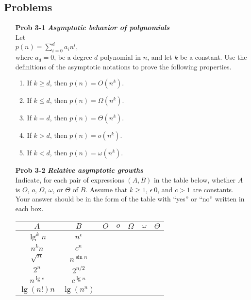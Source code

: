 \documentclass[fontsize=12pt,paper=a4]{book}
\begin{document}
\subsection*{Problems}
\begin{enumerate}
 \item[\textbf{Prob 3-1}]
       \textbf{\textit{Asymptotic behavior of polynomials}}\\
       Let \\
       $p(n) = \sum_{i=0}^{d} a_in^i$,\\
       where $a_d=0$, be a degree-$d$ polynomial in $n$, and let $k$ be a constant. Use the definitions of the asymptotic notations to prove the following properties.
       \begin{enumerate}
        \item If $k \geq d$, then $p(n) = O(n^k)$.
        \item If $k \leq d$, then $p(n) = \Omega(n^k)$.
        \item If $k = d$, then $p(n) = \Theta(n^k)$.
        \item If $k > d$, then $p(n) = o(n^k)$.
        \item If $k < d$, then $p(n) = \omega(n^k)$.
       \end{enumerate}
       
       
 \item[\textbf{Prob 3-2}]
       \textbf{\textit{Relative asymptotic growths}}\\
       Indicate, for each pair of expressions $(A, B)$ in the table below, whether $A$ is $O$, $o$, $\Omega$, $\omega$, or $\Theta$ of $B$. Assume that $k \geq 1$, $\epsilon \> 0$, and $c>1$ are constants. Your answer should be in the form of the table with “yes” or “no” written in each box.
       \begin{tabular}{c c | p{2em} | p{2em} | p{2em} | p{2em} | p{2em} |}
        $A$         & $B$          & $O$ & $o$ & $\Omega$ & $\omega$ & $\Theta$ \\
        \hline
        $\lg^k n$   & $n^\epsilon$ &     &     &          &          &          \\
        \hline
        $n^k n$     & $c^n$        &     &     &          &          &          \\
        \hline
        $\sqrt{n}$  & $n^{\sin n}$ &     &     &          &          &          \\
        \hline
        $2^n$       & $2^{n/2}$    &     &     &          &          &          \\
        \hline
        $n^{\lg c}$ & $c^{\lg n}$  &     &     &          &          &          \\
        \hline
        $\lg(n!) n$ & $\lg(n^n)$   &     &     &          &          &          \\
        \hline
       \end{tabular}
       

\end{enumerate}
\end{document}
